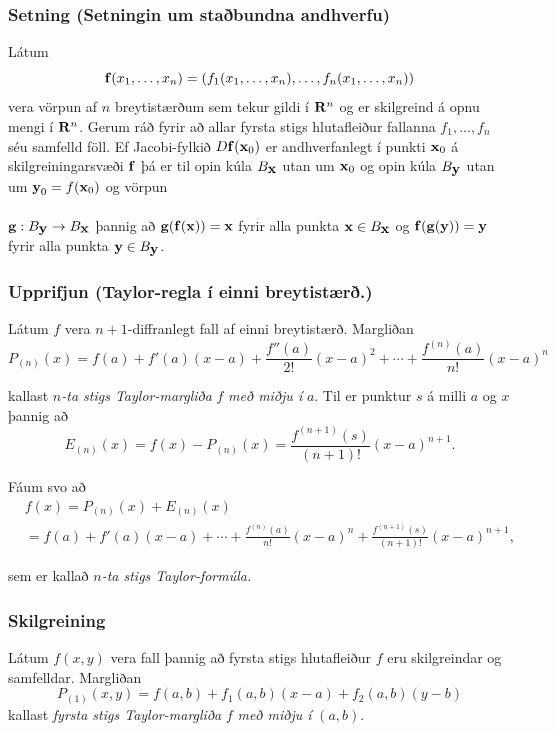 \subsubsection{Setning (Setningin um staðbundna andhverfu)}
Látum $$\mbox{${\bf f}$}(x_1,\ldots,
x_n)=(f_1(x_1,\ldots,x_n),\ldots,f_n(x_1,\ldots,x_n))$$ 
vera vörpun af $n$ breytistærðum sem tekur gildi í $\mbox{${\bf R}^n$}$ og er skilgreind á opnu
mengi í $\mbox{${\bf R}^n$}$. Gerum ráð fyrir að allar fyrsta stigs hlutafleiður fallanna $f_1, \ldots, f_n$ séu 
samfelld föll. Ef Jacobi-fylkið $D\mbox{${\bf f}$}(\mbox{${\bf x}$}_0)$ er andhverfanlegt í punkti
$\mbox{${\bf x}$}_0$ á skilgreiningarsvæði $\mbox{${\bf f}$}$ þá er til opin kúla $B_{\mbox{${\bf x}$}}$ utan
um $\mbox{${\bf x}$}_0$ og opin kúla $B_{\mbox{${\bf y}$}}$ utan um $\mbox{${\bf y}$}_0=f(\mbox{${\bf x}$}_0)$ og vörpun 
\\\\
$\mbox{${\bf g}$}:B_{\mbox{${\bf y}$}}\rightarrow B_{\mbox{${\bf x}$}}$ þannig að 
$\mbox{${\bf g}$}(\mbox{${\bf f}$}(\mbox{${\bf x}$}))=\mbox{${\bf x}$}$ fyrir alla punkta $\mbox{${\bf x}$}\in B_{\mbox{${\bf x}$}}$ og $\mbox{${\bf f}$}(\mbox{${\bf g}$}(\mbox{${\bf y}$}))=\mbox{${\bf y}$}$ fyrir alla punkta $\mbox{${\bf y}$}\in B_{\mbox{${\bf y}$}}$.\\

\subsubsection{Upprifjun  (Taylor-regla í einni breytistærð.)}
  Látum 
$f$ vera $n+1$-diffranlegt fall af einni breytistærð.  Margliðan 
$$P_{(n)}(x)=f(a)+f'(a)(x-a)+\frac{f''(a)}{2!}(x-a)^2
+\cdots+\frac{f^{(n)}(a)}{n!}(x-a)^n$$

kallast $n${\em-ta stigs Taylor-margliða} $f$ {\em með miðju í} $a$.
Til er punktur $s$ á milli $a$ og $x$ þannig að 
$$E_{(n)}(x)=f(x)-P_{(n)}(x)=\frac{f^{(n+1)}(s)}{(n+1)!}(x-a)^{n+1}.$$

Fáum svo að 
\begin {align*}
&f(x)=P_{(n)}(x)+E_{(n)}(x) \\
&=f(a)+f'(a)(x-a)+\cdots+\frac{f^{(n)}(a)}{n!}(x-a)^n
+\frac{f^{(n+1)}(s)}{(n+1)!}(x-a)^{n+1}, 
\end {align*}

 
sem er kallað $n${\em-ta stigs Taylor-formúla.}



\subsubsection{Skilgreining }
 Látum $f(x,y)$ vera fall þannig að fyrsta stigs hlutafleiður $f$ eru skilgreindar og samfelldar.  Margliðan
$$P_{(1)}(x,y)=f(a,b)+f_1(a,b)(x-a)+f_2(a,b)(y-b)$$
kallast {\em fyrsta stigs Taylor-margliða} $f$ {\em með miðju í} $(a,b)$. 



